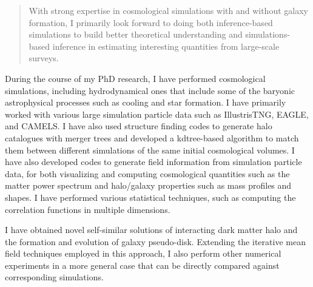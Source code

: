 \documentclass[11pt]{article}
\begin{document}
\begin{quote}
    With strong expertise in cosmological simulations with and without galaxy formation, I primarily look forward to doing both inference-based simulations to build better theoretical understanding and simulations-based inference in estimating interesting quantities from large-scale surveys.
\end{quote}

During the course of my PhD research, I have performed cosmological simulations, including hydrodynamical ones that include some of the baryonic astrophysical processes such as cooling and star formation. I have primarily worked with various large simulation particle data such as IllustrisTNG, EAGLE, and CAMELS. I have also used structure finding codes to generate halo catalogues with merger trees and developed a kdtree-based algorithm to match them between different simulations of the same initial cosmological volumes. I have also developed codes to generate field information from simulation particle data, for both visualizing and computing cosmological quantities such as the matter power spectrum and halo/galaxy properties such as mass profiles and shapes. I have performed various statistical techniques, such as computing the correlation functions in multiple dimensions. 

I have obtained novel self-similar solutions of interacting dark matter halo and the formation and evolution of galaxy pseudo-disk. Extending the iterative mean field techniques employed in this approach, I also perform other numerical experiments in a more general case that can be directly compared against corresponding simulations.



\end{document}
